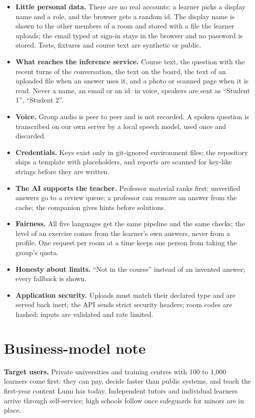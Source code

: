 \documentclass[11pt,a4paper]{article}
\begin{document}
\begin{itemize}
\item \textbf{Little personal data.} There are no real accounts: a learner picks a display name and a role, and the
browser gets a random id. The display name is shown to the other members of a room and stored with a file the learner
uploads; the email typed at sign-in stays in the browser and no password is stored. Tests, fixtures and course text
are synthetic or public.
\item \textbf{What reaches the inference service.} Course text, the question with the recent turns of the conversation,
the text on the board, the text of an uploaded file when an answer uses it, and a photo or scanned page when it is
read. Never a name, an email or an id: in voice, speakers are sent as ``Student 1'', ``Student 2''.
\item \textbf{Voice.} Group audio is peer to peer and is not recorded. A spoken question is transcribed on our own
server by a local speech model, used once and discarded.
\item \textbf{Credentials.} Keys exist only in git-ignored environment files; the repository ships a template with
placeholders, and reports are scanned for key-like strings before they are written.
\item \textbf{The AI supports the teacher.} Professor material ranks first; unverified answers go to a review queue;
a professor can remove an answer from the cache; the companion gives hints before solutions.
\item \textbf{Fairness.} All five languages get the same pipeline and the same checks; the level of an exercise comes
from the learner's own answers, never from a profile. One request per room at a time keeps one person from taking
the group's quota.
\item \textbf{Honesty about limits.} ``Not in the course'' instead of an invented answer; every fallback is shown.
\item \textbf{Application security.} Uploads must match their declared type and are served back inert; the API sends
strict security headers; room codes are hashed; inputs are validated and rate limited.
\end{itemize}

\section{Business-model note}

\textbf{Target users.} Private universities and training centres with 100 to 1{,}000 learners come first: they can
pay, decide faster than public systems, and teach the first-year content Lumi has today. Independent tutors and
individual learners arrive through self-service; high schools follow once safeguards for minors are in place.
\end{document}
